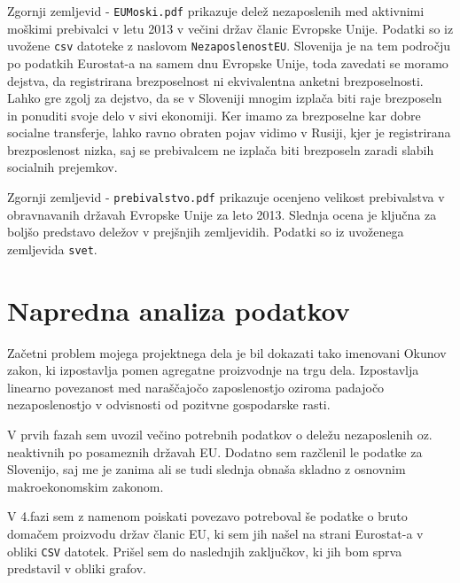 \documentclass[11pt,a4paper]{article}
\begin{document}
Zgornji zemljevid - \verb|EUMoski.pdf| prikazuje delež nezaposlenih med aktivnimi moškimi prebivalci v letu 2013 v večini držav članic Evropske Unije. Podatki so iz uvožene \verb|csv| datoteke z naslovom \verb|NezaposlenostEU|. Slovenija je na tem področju po podatkih Eurostat-a na samem dnu Evropske Unije, toda zavedati se moramo dejstva, da registrirana brezposelnost ni ekvivalentna anketni brezposelnosti. Lahko gre zgolj za dejstvo, da se v Sloveniji mnogim izplača biti raje brezposeln in ponuditi svoje delo v sivi ekonomiji. Ker imamo za brezposelne kar dobre socialne transferje, lahko ravno obraten pojav vidimo v Rusiji, kjer je registrirana brezposlenost nizka, saj se prebivalcem ne izplača biti brezposeln zaradi slabih socialnih prejemkov.


Zgornji zemljevid - \verb|prebivalstvo.pdf| prikazuje ocenjeno velikost prebivalstva v obravnavanih državah Evropske Unije za leto 2013. Slednja ocena je ključna za boljšo predstavo deležov v prejšnjih zemljevidih. Podatki so iz uvoženega zemljevida \verb|svet|. 

\pagebreak
\section{Napredna analiza podatkov}

Začetni problem mojega projektnega dela je bil dokazati tako imenovani Okunov zakon, ki izpostavlja pomen agregatne proizvodnje na trgu dela. Izpostavlja linearno povezanost med naraščajočo zaposlenostjo oziroma padajočo nezaposlenostjo v odvisnosti od pozitvne gospodarske rasti. 

V prvih fazah sem uvozil večino potrebnih podatkov o deležu nezaposlenih oz. neaktivnih po posameznih državah EU. Dodatno sem razčlenil le podatke za Slovenijo, saj me je zanima ali se tudi slednja obnaša skladno z osnovnim makroekonomskim zakonom.

V 4.fazi sem z namenom poiskati povezavo potreboval še podatke o bruto domačem proizvodu držav članic EU, ki sem jih našel na strani Eurostat-a v obliki \verb|CSV| datotek. Prišel sem do naslednjih zaključkov, ki jih bom sprva predstavil v obliki grafov.
\end{document}
